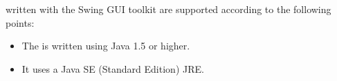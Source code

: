  \gdauts{} written with the Swing GUI toolkit are supported according to the following points:


\begin{itemize}
\item The \gdaut{} is written using Java 1.5 or higher. 
\item It uses a Java SE (Standard Edition) JRE.
\end{itemize}


